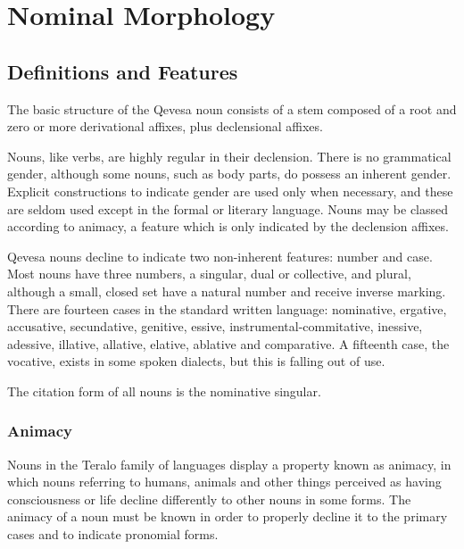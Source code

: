 \documentclass[grammar]{subfiles}
\begin{document}
  \chapter{Nominal Morphology}
  \label{ch:nominal_morphology}

  \section{Definitions and Features}
  \label{sec:nm_definition_features}

  The basic structure of the Qevesa noun consists of a stem composed of a root and zero or more derivational affixes, plus declensional affixes.

  Nouns, like verbs, are highly regular in their declension. There is no grammatical gender, although some nouns, such as body parts, do possess an inherent gender. Explicit constructions to indicate gender are used only when necessary, and these are seldom used except in the formal or literary language. Nouns may be classed according to animacy, a feature which is only indicated by the declension affixes.

  Qevesa nouns decline to indicate two non-inherent features: number and case. Most nouns have three numbers, a singular, dual or collective, and plural, although a small, closed set have a natural number and receive inverse marking. There are fourteen cases in the standard written language: nominative, ergative, accusative, secundative, genitive, essive, instrumental-commitative, inessive, adessive, illative, allative, elative, ablative and comparative. A fifteenth case, the vocative, exists in some spoken dialects, but this is falling out of use\footnotemark.

  The citation form of all nouns is the nominative singular.

  \subsection{Animacy}
  \label{ssec:nm_animacy}

  Nouns in the Teralo family of languages display a property known as animacy, in which nouns referring to humans, animals and other things perceived as having consciousness or life decline differently to other nouns in some forms. The animacy of a noun must be known in order to properly decline it to the primary cases and to indicate pronomial forms.
\end{document}
